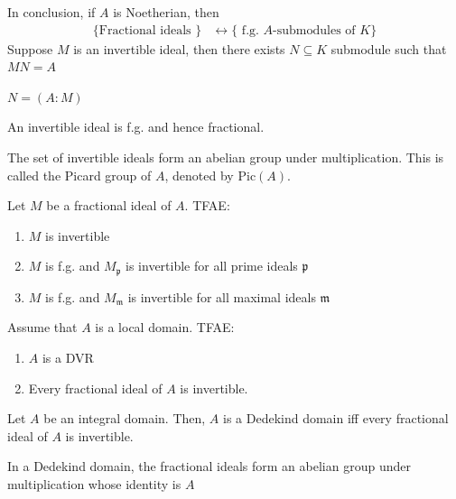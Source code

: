 \documentclass[oneside, 12pt]{scrbook}
\newcommand{\pr}{\mathfrak{p}}
\newcommand{\m}{\mathfrak{m}}
\theoremstyle{theorem}
\begin{document}
In conclusion, if $A$ is Noetherian, then 
\begin{align*}
\{ \text{Fractional ideals } \} &\leftrightarrow \{\text{ f.g. $A$-submodules of $K$}\}
\end{align*}
Suppose $M$ is an invertible ideal, then there exists $N \subseteq K$ submodule such that $MN=A$

\begin{proposition}
$N=(A:M)$
\end{proposition}

\begin{proposition}
An invertible ideal is f.g. and hence fractional.
\end{proposition}

\begin{remark}
The set of invertible ideals form an abelian group under multiplication. This is called the Picard group of $A$, denoted by $\mathrm{Pic}(A)$.
\end{remark}

\begin{proposition}
Let $M$ be a fractional ideal of $A$. TFAE: 
\begin{enumerate}
\item $M$ is invertible
\item $M$ is f.g. and $M_{\pr}$ is invertible for all prime ideals $\pr$
\item $M$ is f.g. and $M_{\m}$ is invertible for all maximal ideals $\m$
\end{enumerate}
\end{proposition}

\begin{proposition}
Assume that $A$ is a local domain. TFAE: 
\begin{enumerate}
\item $A$ is a DVR
\item Every fractional ideal of $A$ is invertible.
\end{enumerate}
\end{proposition}

\begin{theorem}
Let $A$ be an integral domain. Then, $A$ is a Dedekind domain iff every fractional ideal of $A$ is invertible.
\end{theorem}

\begin{corollary}
In a Dedekind domain, the fractional ideals form an abelian group under multiplication whose identity is $A$
\end{corollary}
\end{document}
